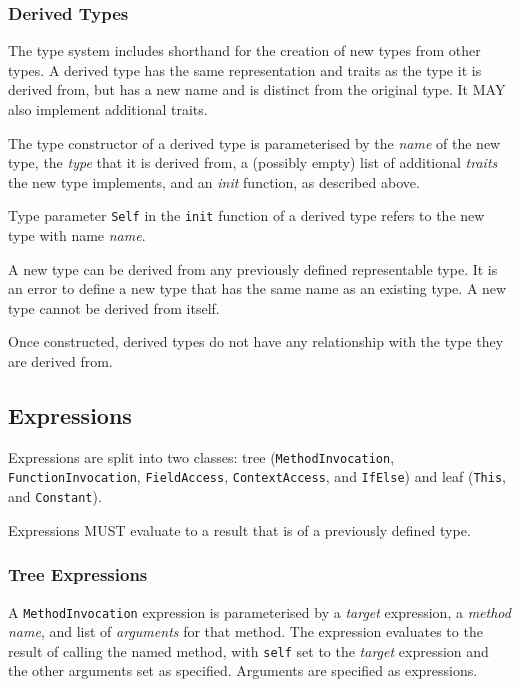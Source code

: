 \documentclass[10pt,twocolumn,a4paper]{article}
\newcommand{\code}[1]{\texttt{#1}}
\begin{document}
\subsubsection{Derived Types}

The type system includes shorthand for the creation of new types from other
types. A derived type has the same representation
and traits as the type it is derived from, but has a new name and is
distinct from the original type. It MAY also implement additional traits.

The type constructor of a derived type is parameterised by the \emph{name} of
the new type, the \emph{type} that it is derived from, a (possibly empty) list
of additional \emph{traits} the new type implements, and an \emph{init}
function, as described above.

Type parameter \code{Self} in the \code{init} function of a derived type refers
to the new type with name \emph{name}.

A new type can be derived from any previously defined representable type. It is
an error to define a new type that has the same name as an existing type. A new
type cannot be derived from itself.

Once constructed, derived types do not have any relationship with the type they
are derived from.

\subsection{Expressions}
\label{sec:expressions}

Expressions are split into two classes:
tree (\code{MethodInvocation}, \code{FunctionInvocation}, \code{FieldAccess},
      \code{ContextAccess}, and \code{IfElse})
and
leaf (\code{This}, and \code{Constant}).

Expressions MUST evaluate to a result that is of a previously defined type.

\subsubsection{Tree Expressions}

A \code{MethodInvocation} expression is parameterised by a \emph{target} expression, a
\emph{method name}, and list of \emph{arguments} for that method. The expression evaluates
to the result of calling the named method, with \code{self} set to the \emph{target}
expression and the other arguments set as specified. Arguments are specified as expressions.
\end{document}
